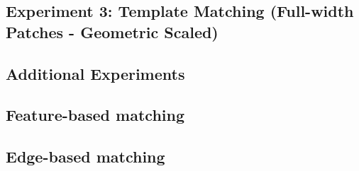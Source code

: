 \subsection{Experiment 3: Template Matching (Full-width Patches - Geometric Scaled)}
\label{tm-scaled}

\subsection{Additional Experiments}

\subsection{Feature-based matching}
\subsection{Edge-based matching}




